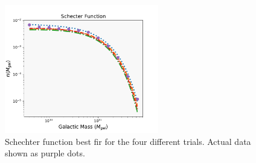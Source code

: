 \documentclass{article}
\begin{document}
\begin{figure}[t]
  \centering
    \includegraphics[width=0.6\textwidth]{schecter_function_2.pdf}
      \caption{Schechter function best fir for the four different trials. Actual data shown as purple dots.}
    \label{schechter}
\end{figure}
\end{document}
